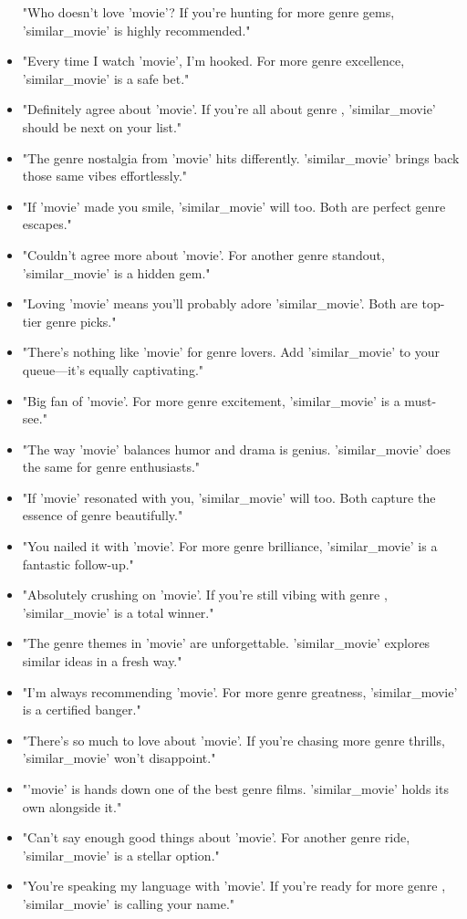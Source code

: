 \begin{LTR}
\begin{itemize}
"Who doesn’t love '{movie}'? If you’re hunting for more {genre} gems, '{similar\_movie}' is highly recommended."
\item
"Every time I watch '{movie}', I’m hooked. For more {genre} excellence, '{similar\_movie}' is a safe bet."
\item
"Definitely agree about '{movie}'. If you’re all about {genre} , '{similar\_movie}' should be next on your list."
\item
"The {genre} nostalgia from '{movie}' hits differently. '{similar\_movie}' brings back those same vibes effortlessly."
\item
"If '{movie}' made you smile, '{similar\_movie}' will too. Both are perfect {genre} escapes."
\item
"Couldn’t agree more about '{movie}'. For another {genre} standout, '{similar\_movie}' is a hidden gem."
\item
"Loving '{movie}' means you’ll probably adore '{similar\_movie}'. Both are top-tier {genre} picks."
\item
"There’s nothing like '{movie}' for {genre} lovers. Add '{similar\_movie}' to your queue—it’s equally captivating."
\item
"Big fan of '{movie}'. For more {genre} excitement, '{similar\_movie}' is a must-see."
\item
"The way '{movie}' balances humor and drama is genius. '{similar\_movie}' does the same for {genre} enthusiasts."
\item
"If '{movie}' resonated with you, '{similar\_movie}' will too. Both capture the essence of {genre} beautifully."
\item
"You nailed it with '{movie}'. For more {genre} brilliance, '{similar\_movie}' is a fantastic follow-up."
\item
"Absolutely crushing on '{movie}'. If you’re still vibing with {genre} , '{similar\_movie}' is a total winner."
\item
"The {genre} themes in '{movie}' are unforgettable. '{similar\_movie}' explores similar ideas in a fresh way."
\item
"I’m always recommending '{movie}'. For more {genre} greatness, '{similar\_movie}' is a certified banger."
\item
"There’s so much to love about '{movie}'. If you’re chasing more {genre} thrills, '{similar\_movie}' won’t disappoint."
\item
"'{movie}' is hands down one of the best {genre} films. '{similar\_movie}' holds its own alongside it."
\item
"Can’t say enough good things about '{movie}'. For another {genre} ride, '{similar\_movie}' is a stellar option."
\item
"You’re speaking my language with '{movie}'. If you’re ready for more {genre} , '{similar\_movie}' is calling your name."
\end{itemize}

\end{LTR}

